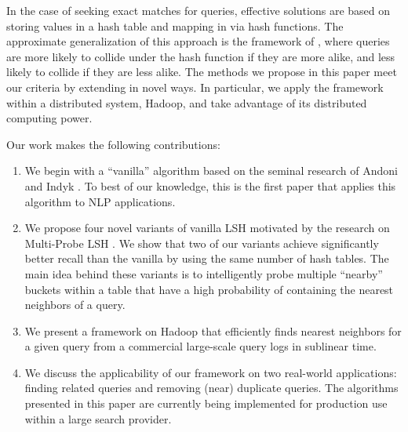 In the case of seeking exact matches for queries, effective solutions
are based on storing values in a hash table and mapping in via hash
functions. 
The approximate generalization of this approach is the framework of
\lshf, where queries are more likely to collide
under the hash function if they are more alike, and less likely to collide
if they are less alike. 
The methods we propose in this paper meet our criteria by extending \lshf 
\cite{Indyk98STOC,Charikar02STOC,Andoni06FOCS,Andoni08CACM}  in novel ways. 
In particular, we apply the framework within a distributed 
system, Hadoop, and take advantage of its distributed computing power.

Our work makes the following contributions: 
\begin{enumerate}
\item We begin with a ``vanilla'' \lsh algorithm based on the seminal
  research of Andoni and Indyk  .
 To best of our knowledge, this is the first paper that applies this algorithm to NLP applications. 
\item We propose four novel variants of vanilla LSH motivated by the
  research on Multi-Probe LSH \cite{LvVLDB07}.  We show that two of
  our variants achieve significantly better recall than the vanilla
  \lsh by using the same number of hash tables. The main idea behind
  these variants is to intelligently probe multiple ``nearby'' buckets within a table that have a high probability of containing the nearest neighbors of a query.  
\item We present a framework on Hadoop that efficiently finds nearest neighbors for a given query from a commercial large-scale query logs in sublinear time. %
\item  We discuss the applicability of our framework on two real-world
  applications: finding related queries and removing (near) duplicate
  queries. The algorithms presented in this paper are currently being
implemented for production use within a large search provider. 
\end{enumerate}

